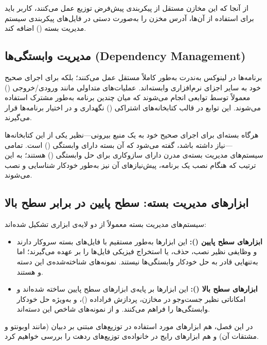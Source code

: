 از آنجا که این مخازن مستقل از پیکربندی پیش‌فرض توزیع عمل می‌کنند، کاربر باید برای استفاده از آن‌ها، آدرس مخزن را به‌صورت دستی در فایل‌های پیکربندی سیستم مدیریت بسته () اضافه کند.

\subsection{مدیریت وابستگی‌ها (Dependency Management)}

برنامه‌ها در لینوکس به‌ندرت به‌طور کاملاً مستقل عمل می‌کنند؛ بلکه برای اجرای صحیح خود به سایر اجزای نرم‌افزاری وابسته‌اند. عملیات‌های متداولی مانند ورودی/خروجی () معمولاً توسط توابعی انجام می‌شوند که میان چندین برنامه به‌طور مشترک استفاده می‌شوند. این توابع در قالب کتابخانه‌های اشتراکی () نگهداری و در اختیار برنامه‌ها قرار می‌گیرند.

هرگاه بسته‌ای برای اجرای صحیح خود به یک منبع بیرونی—نظیر یکی از این کتابخانه‌ها—نیاز داشته باشد، گفته می‌شود که آن بسته دارای وابستگی () است. تمامی سیستم‌های مدیریت بسته‌ی مدرن دارای سازوکاری برای حل وابستگی () هستند؛ به این ترتیب که هنگام نصب یک برنامه، پیش‌نیازهای آن نیز به‌طور خودکار شناسایی و نصب می‌شوند.

\subsection{ابزارهای مدیریت بسته: سطح پایین در برابر سطح بالا}

سیستم‌های مدیریت بسته معمولاً از دو لایه‌ی ابزاری تشکیل شده‌اند:

\begin{itemize}
  \item \textbf{ابزارهای سطح پایین ():} این ابزارها به‌طور مستقیم با فایل‌های بسته سروکار دارند و وظایفی نظیر نصب، حذف، یا استخراج فیزیکی فایل‌ها را بر عهده می‌گیرند؛ اما به‌تنهایی قادر به حل خودکار وابستگی‌ها نیستند. نمونه‌های شناخته‌شده‌ی این دسته  و  هستند.

  \item \textbf{ابزارهای سطح بالا ():} این ابزارها بر پایه‌ی ابزارهای سطح پایین ساخته شده‌اند و امکاناتی نظیر جست‌وجو در مخازن، پردازش فراداده ()، و به‌ویژه حل خودکار وابستگی‌ها را فراهم می‌کنند.  و  از نمونه‌های شاخص این دسته‌اند.
\end{itemize}

در این فصل، هم ابزارهای مورد استفاده در توزیع‌های مبتنی بر دبیان (مانند اوبونتو و مشتقات آن) و هم ابزارهای رایج در خانواده‌ی توزیع‌های ردهت را بررسی خواهیم کرد.

